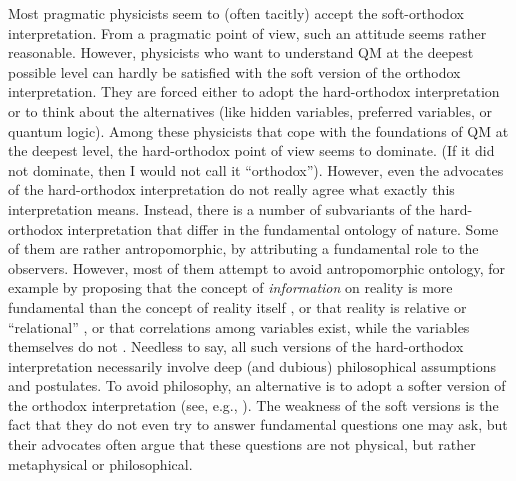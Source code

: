 \documentclass[12pt]{article}
\begin{document}
Most pragmatic physicists seem to (often tacitly) accept the soft-orthodox 
interpretation. From a pragmatic point of view, such an 
attitude seems rather reasonable. However, physicists 
who want to understand QM at the deepest possible level can hardly 
be satisfied with the soft version of the orthodox interpretation.
They are forced either to adopt the hard-orthodox interpretation 
or to think about the alternatives (like hidden 
variables, preferred variables, or quantum logic). 
Among these physicists that cope with the foundations of QM
at the deepest level, 
the hard-orthodox point of view seems to dominate.
(If it did not dominate, then I would not call it ``orthodox'').
However, even the advocates of the hard-orthodox interpretation 
do not really agree what exactly this interpretation means.
Instead, there is a number of subvariants of the
hard-orthodox interpretation that differ
in the fundamental ontology of nature.
Some of them are rather antropomorphic, by attributing 
a fundamental role to the observers.
However, most of them attempt to avoid antropomorphic 
ontology, for example by proposing that  
the concept of {\em information} on reality is more fundamental 
than the concept of reality itself \cite{zeil}, 
or that reality is relative or ``relational'' 
\cite{rov1,rov2}, or that correlations among variables exist, 
while the variables themselves do not \cite{mermcor}.
Needless to say, all such versions of the hard-orthodox
interpretation necessarily involve deep (and dubious)
philosophical assumptions and postulates.
To avoid philosophy, an alternative is to adopt 
a softer version of the orthodox interpretation 
(see, e.g., \cite{medina}). The weakness of the 
soft versions is the fact that they do not even try to 
answer fundamental questions one may ask, but 
their advocates often argue that these questions are not 
physical, but rather metaphysical or philosophical.    
\end{document}
